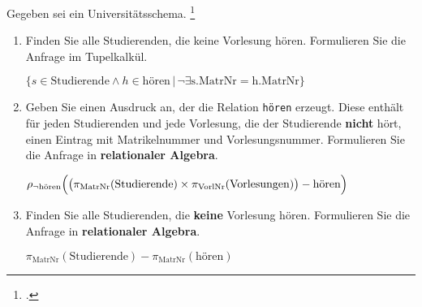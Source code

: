 \documentclass{lehramt-informatik-aufgabe}
\begin{document}

Gegeben sei ein Universitätsschema.
\footcite{examen:66116:2020:03}

\begin{enumerate}


\item Finden Sie alle Studierenden, die keine Vorlesung hören.
Formulieren Sie die Anfrage im Tupelkalkül.

\begin{liAntwort}
$\{ s \in \text{Studierende} \land h \in \text{hören} \, | \, \neg \exists \text{s.MatrNr} = \text{h.MatrNr} \}$
\end{liAntwort}


\item Geben Sie einen Ausdruck an, der die Relation \neg \texttt{hören}
erzeugt. Diese enthält für jeden Studierenden und jede Vorlesung, die
der Studierende \textbf{nicht} hört, einen Eintrag mit Matrikelnummer
und Vorlesungsnummer. Formulieren Sie die Anfrage in
\textbf{relationaler Algebra}.

\begin{liAntwort}
$\rho_{\neg \text{hören}} \Bigl(
\bigl(
  \pi_{\text{MatrNr}}(\text{Studierende})
  \times
  \pi_{\text{VorlNr}}(\text{Vorlesungen})
\bigr) - \text{hören}
\Bigr)
$
\end{liAntwort}


\item Finden Sie alle Studierenden, die \textbf{keine} Vorlesung hören.
Formulieren Sie die Anfrage in \textbf{relationaler Algebra}.

\begin{liAntwort}
$\pi_{\text{MatrNr}}(\text{Studierende}) - \pi_{\text{MatrNr}}(\text{hören})$
\end{liAntwort}
\end{enumerate}
\end{document}
